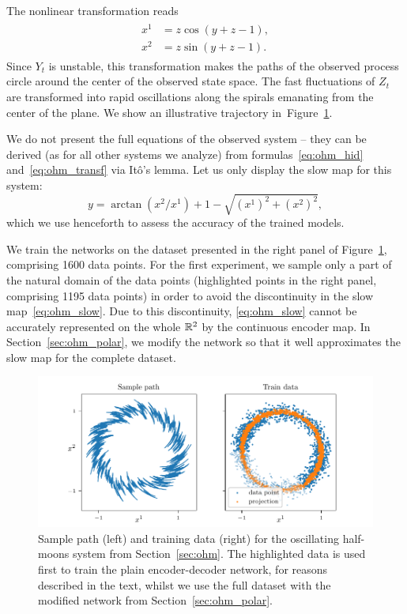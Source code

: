 \documentclass{article}
\begin{document}
The nonlinear transformation reads
\begin{gather}\label{eq:ohm_transf}
    \begin{aligned}
        x^1 &= z\cos(y+z-1),\\
        x^2 &= z\sin(y+z-1).
    \end{aligned}
\end{gather}
Since $Y_t$ is unstable, this transformation makes the paths of the observed process circle around the center of the observed state space. The fast fluctuations of $Z_t$ are transformed into rapid oscillations along the spirals emanating from the center of the plane. We show an illustrative trajectory in~Figure~\ref{fig:cresc2d_path_data}.

We do not present the full equations of the observed system -- they can be derived (as for all other systems we analyze) from formulas~\eqref{eq:ohm_hid} and~\eqref{eq:ohm_transf} via It\^{o}'s lemma. Let us only display the slow map for this system:
\begin{equation}\label{eq:ohm_slow}
    y = \arctan(x^2/x^1) + 1 - \sqrt{(x^1)^2 + (x^2)^2},
\end{equation}
which we use henceforth to assess the accuracy of the trained models.

We train the networks on the dataset presented in the right panel of Figure~\ref{fig:cresc2d_path_data}, comprising 1600 data points. For the first experiment, we sample only a part of the natural domain of the data points (highlighted points in the right panel, comprising 1195 data points) in order to avoid the discontinuity in the slow map~\eqref{eq:ohm_slow}. Due to this discontinuity, \eqref{eq:ohm_slow} cannot be accurately represented on the whole $\mathbb{R}^2$ by the continuous encoder map. In Section~\ref{sec:ohm_polar}, we modify the network so that it well approximates the slow map for the complete dataset.

\begin{figure}
    \centering
    \includegraphics[width=\textwidth]{figs/cresc2d_path_data.pdf}
    \caption{Sample path (left) and training data (right) for the oscillating half-moons system from Section~\ref{sec:ohm}. The highlighted data is used first to train the plain encoder-decoder network, for reasons described in the text, whilst we use the full dataset with the modified network from Section~\ref{sec:ohm_polar}.}
    \label{fig:cresc2d_path_data}
\end{figure}
\end{document}
